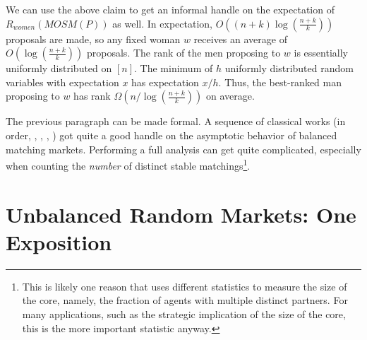 \documentclass[12pt]{article}
\begin{document}
  We can use the above claim to get an informal handle on the expectation
  of $R_{women}(MOSM(P))$ as well.
  In expectation, $O\left((n+k)\log\left(\frac{n+k}{k}\right)\right)$
  proposals are made, so any
  fixed woman $w$ receives an average of
  $O\left(\log\left(\frac{n+k}{k}\right)\right)$ proposals.
  The rank of the men proposing to $w$ is essentially uniformly distributed 
  on $[n]$. The minimum of $h$ uniformly distributed random variables with
  expectation $x$ has expectation $x/h$.
  Thus, the best-ranked man proposing to $w$ has rank
  $\Omega\left(n / \log\left(\frac{n+k}{k}\right) \right)$ on average.

  The previous paragraph can be made formal. A sequence of classical works 
  (in order, \cite{WilsonAnalysisStable72}, \cite{KnuthStableCombinatorial97},
  \cite{PittelAverageStable89}, \cite{PittelLikelyStable92}) got
  quite a good handle on the asymptotic behavior of balanced matching markets.
  Performing a full analysis can get quite complicated, especially when counting
  the \emph{number} of distinct stable matchings\footnote{ 
    This is likely one reason that 
    \cite{AshlagiUnbalancedCompetition17} uses different statistics to measure the
    size of the core, namely, the fraction of agents with multiple distinct
    partners. For many applications, such as the strategic implication of the
    size of the core, this is the more important statistic anyway.
  }.


\section{Unbalanced Random Markets: One Exposition}
\end{document}
